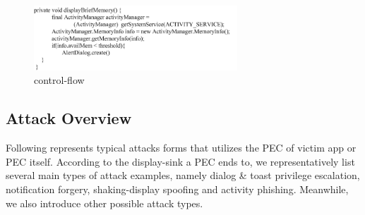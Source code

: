 \documentclass{sig-alternate-05-2015}
\begin{document}
%
\begin{figure}
\centering
\includegraphics[width = 3.0in]{code1.png}
\caption{\label{}control-flow}
\end{figure}

\subsection{Attack Overview}

Following represents typical attacks forms that utilizes the PEC of victim app or PEC itself. According to the display-sink a PEC ends to, we representatively list several main types of attack examples, namely dialog \& toast privilege escalation, notification forgery, shaking-display spoofing and activity phishing. Meanwhile, we also introduce other possible attack types.
\end{document}
